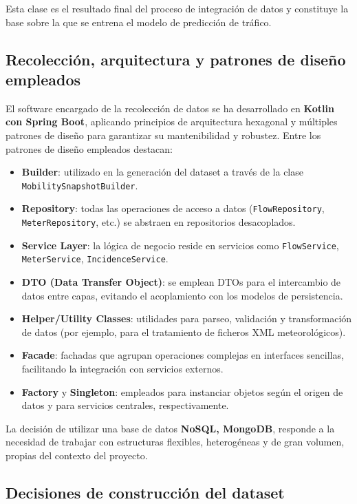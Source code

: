 Esta clase es el resultado final del proceso de integración de datos y constituye la base sobre la que se entrena el modelo de predicción de tráfico.

\subsection{Recolección, arquitectura y patrones de diseño empleados}

El software encargado de la recolección de datos se ha desarrollado en \textbf{Kotlin con Spring Boot}, aplicando principios de arquitectura hexagonal y múltiples patrones de diseño para garantizar su mantenibilidad y robustez. Entre los patrones de diseño empleados destacan:

\begin{itemize}
	\item \textbf{Builder}: utilizado en la generación del dataset a través de la clase \texttt{MobilitySnapshotBuilder}.
	\item \textbf{Repository}: todas las operaciones de acceso a datos (\texttt{FlowRepository}, \texttt{MeterRepository}, etc.) se abstraen en repositorios desacoplados.
	\item \textbf{Service Layer}: la lógica de negocio reside en servicios como \texttt{FlowService}, \texttt{MeterService}, \texttt{IncidenceService}.
	\item \textbf{DTO (Data Transfer Object)}: se emplean DTOs para el intercambio de datos entre capas, evitando el acoplamiento con los modelos de persistencia.
	\item \textbf{Helper/Utility Classes}: utilidades para parseo, validación y transformación de datos (por ejemplo, para el tratamiento de ficheros XML meteorológicos).
	\item \textbf{Facade}: fachadas que agrupan operaciones complejas en interfaces sencillas, facilitando la integración con servicios externos.
	\item \textbf{Factory} y \textbf{Singleton}: empleados para instanciar objetos según el origen de datos y para servicios centrales, respectivamente.
\end{itemize}

La decisión de utilizar una base de datos \textbf{NoSQL, MongoDB}, responde a la necesidad de trabajar con estructuras flexibles, heterogéneas y de gran volumen, propias del contexto del proyecto.

\subsection{Decisiones de construcción del dataset}

